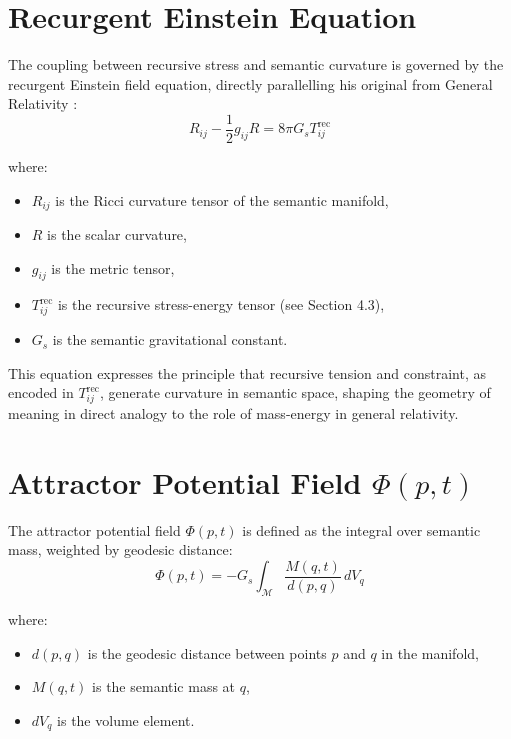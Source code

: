 \section{Recurgent Einstein Equation}

The coupling between recursive stress and semantic curvature is governed by the recurgent Einstein field equation, directly parallelling his original from General Relativity \autocite{Einstein1915, MisnerThorneWheeler1973}:
\begin{equation}
R_{ij} - \frac{1}{2}g_{ij}R = 8\pi G_s T^{\text{rec}}_{ij}
\end{equation}

where:
\begin{itemize}
    \item \(R_{ij}\) is the Ricci curvature tensor of the semantic manifold,
    \item \(R\) is the scalar curvature,
    \item \(g_{ij}\) is the metric tensor,
    \item \(T^{\text{rec}}_{ij}\) is the recursive stress-energy tensor (see Section 4.3),
    \item \(G_s\) is the semantic gravitational constant.
\end{itemize}

This equation expresses the principle that recursive tension and constraint, as encoded in \(T^{\text{rec}}_{ij}\), generate curvature in semantic space, shaping the geometry of meaning in direct analogy to the role of mass-energy in general relativity.

\section[Attractor Potential Field Phi(p, t)]{Attractor Potential Field \(\Phi(p, t)\)}

The attractor potential field \(\Phi(p, t)\) is defined as the integral over semantic mass, weighted by geodesic distance:
\begin{equation}
\Phi(p, t) = -G_s \int_{\mathcal{M}} \frac{M(q, t)}{d(p, q)} \, dV_q
\end{equation}

where:
\begin{itemize}
    \item \(d(p, q)\) is the geodesic distance between points \(p\) and \(q\) in the manifold,
    \item \(M(q, t)\) is the semantic mass at \(q\),
    \item \(dV_q\) is the volume element.
\end{itemize}

